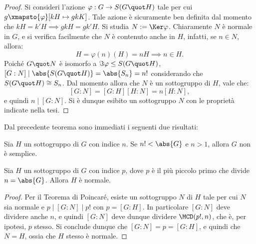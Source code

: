 \documentclass[12pt]{scrartcl}
\begin{document}
	\begin{proof}
		Si consideri l'azione $\varphi : G \to S(G \quot H)$ tale per cui
		$g \xmapsto{\varphi} [kH \mapsto gkK]$. Tale azione è sicuramente
		ben definita dal momento che $kH = k'H \implies gkH = gk'H$. Si
		studia $N := \Ker \varphi$. Chiaramente $N$ è normale in $G$, e si
		verifica facilmente che $N$ è contenuto anche in $H$, infatti, se
		$n \in N$, allora:
		\[ H = \varphi(n)(H) = nH \implies n \in H. \]
		Poiché $G \quot N$ è isomorfo a $\Im \varphi \leq S(G \quot H)$,
		$[G : N] \mid \abs{S(G \quot H)} = \abs{S_n} = n!$ considerando che
		$S(G \quot H) \cong S_n$. Dal momento allora che $N$ è un sottogruppo
		di $H$, vale che:
		\[ [G : N] = [G : H] [H : N] = n [H : N], \]
		e quindi $n \mid [G : N]$. Si è dunque esibito un sottogruppo $N$ con
		le proprietà indicate nella tesi.
	\end{proof}
	
	Dal precedente teorema sono immediati i seguenti due risultati:
	
	\begin{corollary}
		Sia $H$ un sottogruppo di $G$ con indice $n$. Se $n! < \abs{G}$ e
		$n>1$, allora $G$ non è semplice.
	\end{corollary}
	
	\begin{corollary}
		Sia $H$ un sottogruppo di $G$ con indice $p$, dove $p$ è il più piccolo
		primo che divide $n = \abs{G}$. Allora $H$ è normale.
	\end{corollary}
	
	\begin{proof}
		Per il Teorema di Poincaré, esiste un sottogruppo $N$ di $H$ tale per cui
		$N$ sia normale e $p \mid [G : N] \mid p!$ con $p = [G : H]$. In particolare
		$[G : N]$ deve dividere anche $n$, e quindi $[G : N]$ deve dunque
		dividere $\MCD(p!, n)$, che è, per ipotesi, $p$ stesso. Si conclude dunque
		che $[G : N] = p = [G : H]$, e quindi che $N = H$, ossia che $H$ stesso
		è normale.
	\end{proof}
	
\end{document}
